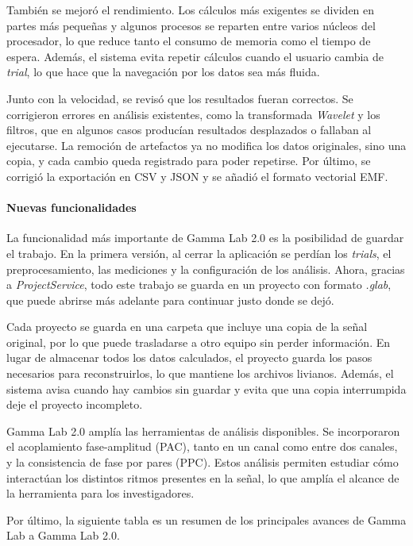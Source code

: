 \documentclass[12pt,letterpaper,oneside]{article}
\begin{document}
También se mejoró el rendimiento. Los cálculos más exigentes se dividen en partes más pequeñas y algunos procesos se reparten entre varios núcleos del procesador, lo que reduce tanto el consumo de memoria como el tiempo de espera. Además, el sistema evita repetir cálculos cuando el usuario cambia de \textit{trial}, lo que hace que la navegación por los datos sea más fluida.

Junto con la velocidad, se revisó que los resultados fueran correctos. Se corrigieron errores en análisis existentes, como la transformada \textit{Wavelet} y los filtros, que en algunos casos producían resultados desplazados o fallaban al ejecutarse. La remoción de artefactos ya no modifica los datos originales, sino una copia, y cada cambio queda registrado para poder repetirse. Por último, se corrigió la exportación en CSV y JSON y se añadió el formato vectorial EMF.

\paragraph{Nuevas funcionalidades}

La funcionalidad más importante de Gamma Lab 2.0 es la posibilidad de guardar el trabajo. En la primera versión, al cerrar la aplicación se perdían los \textit{trials}, el preprocesamiento, las mediciones y la configuración de los análisis. Ahora, gracias a \textit{ProjectService}, todo este trabajo se guarda en un proyecto con formato \textit{.glab}, que puede abrirse más adelante para continuar justo donde se dejó.

Cada proyecto se guarda en una carpeta que incluye una copia de la señal original, por lo que puede trasladarse a otro equipo sin perder información. En lugar de almacenar todos los datos calculados, el proyecto guarda los pasos necesarios para reconstruirlos, lo que mantiene los archivos livianos. Además, el sistema avisa cuando hay cambios sin guardar y evita que una copia interrumpida deje el proyecto incompleto.

Gamma Lab 2.0 amplía las herramientas de análisis disponibles. Se incorporaron el acoplamiento fase-amplitud (PAC), tanto en un canal como entre dos canales, y la consistencia de fase por pares (PPC). Estos análisis permiten estudiar cómo interactúan los distintos ritmos presentes en la señal, lo que amplía el alcance de la herramienta para los investigadores.

Por último, la siguiente tabla es un resumen de los principales avances de Gamma Lab a Gamma Lab 2.0.
\end{document}
